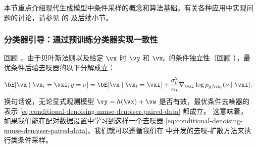 \documentclass[../../book-main_zh.tex]{subfiles}
\begin{document}
本节重点介绍现代生成模型中条件采样的概念和算法基础。有关各种应用中实现问题的讨论，请参见  的
 及后续小节。

\subsubsection{分类器引导：通过预训练分类器实现一致性}

回顾 ，由于贝叶斯法则以及给定 $\vx$ 时 $\vy$ 和 $\vx_t$ 的条件独立性（回顾
），最优条件后验去噪器的以下分解成立：
\begin{equation}\label{eq:conditional-denoising-mmse-denoiser-paired-data}
    \bE[ \vx \mid \vx_t=\vxi, y=\nu]
    =
    \bE[\vx \mid \vx_t=\vxi]
    + \frac{\sigma_t^2}{\alpha_t}
    \nabla_{\vxi}\log p_{y \mid \vx_t}(\nu\mid \vxi).
\end{equation}
换句话说，无论显式观测模型 $\vy = h(\vx) + \vw$ 是否有效，最优条件去噪器的表示
\eqref{eq:conditional-denoising-mmse-denoiser-paired-data} 都成立。
这意味着，如果我们能在配对数据设置中学习到这样一个去噪器
\eqref{eq:conditional-denoising-mmse-denoiser-paired-data}，我们就可以遵循我们在
 中开发的去噪-扩散方法来执行类条件采样。
\end{document}
